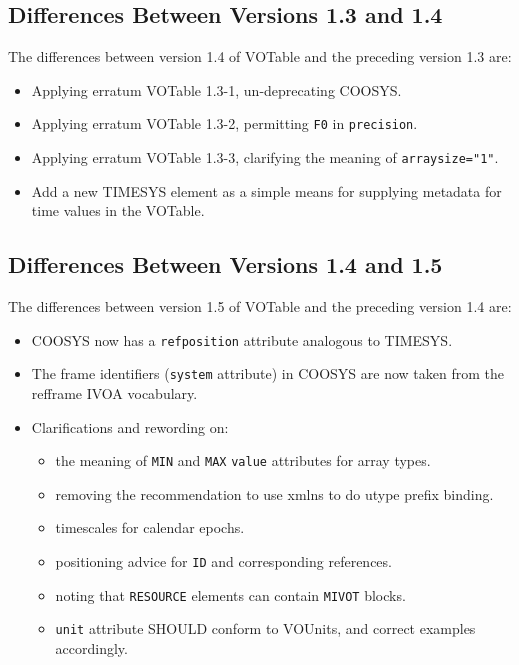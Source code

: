 \documentclass[11pt,a4paper]{ivoa}
\let\fg=\color
\def\attr#1{{\tt{\fg{DarkRed}#1}}}
\def\elem#1{{\tt{\fg{DarkRed}#1}}}
\def\attrval#1#2{{\tt{\fg{DarkRed}#1}="{\fg{DarkPurple}#2}"}}
\begin{document}
\subsection{Differences Between Versions 1.3 and 1.4}
\label{diff1.3-1.4}
The differences between version 1.4 of VOTable and the preceding
version 1.3 are:

\begin{itemize}
\item Applying erratum VOTable 1.3-1, un-deprecating COOSYS.
\item Applying erratum VOTable 1.3-2, permitting \verb|F0| in
\attr{precision}.
\item Applying erratum VOTable 1.3-3, clarifying the meaning of
\attrval{arraysize}{1}.
\item Add a new TIMESYS element as a simple means for
     supplying metadata for time values in the VOTable.
\end{itemize}


\subsection{Differences Between Versions 1.4 and 1.5}
\label{diff1.4-1.5}
The differences between version 1.5 of VOTable and the preceding
version 1.4 are:

\begin{itemize}
\item COOSYS now has a \attr{refposition} attribute analogous to TIMESYS.
\item The frame identifiers (\attr{system} attribute) in COOSYS are now taken
from the refframe IVOA vocabulary.
\item Clarifications and rewording on:
  \begin{itemize}
    \item the meaning of \elem{MIN} and \elem{MAX} \attr{value} attributes for
    array types.
    \item removing the recommendation to use xmlns to do utype prefix binding.
    \item timescales for calendar epochs.
    \item positioning advice for \attr{ID} and corresponding references.
    \item noting that \elem{RESOURCE} elements can contain \elem{MIVOT} blocks.
    \item \attr{unit} attribute SHOULD conform to VOUnits,
          and correct examples accordingly.
  \end{itemize}
\end{itemize}
\end{document}
